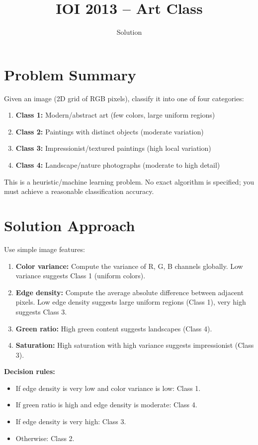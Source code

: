 \documentclass[11pt,a4paper]{article}
\title{IOI 2013 -- Art Class}
\author{Solution}
\date{}
\begin{document}
\maketitle

\section{Problem Summary}
Given an image (2D grid of RGB pixels), classify it into one of four categories:
\begin{enumerate}
    \item \textbf{Class 1:} Modern/abstract art (few colors, large uniform regions)
    \item \textbf{Class 2:} Paintings with distinct objects (moderate variation)
    \item \textbf{Class 3:} Impressionist/textured paintings (high local variation)
    \item \textbf{Class 4:} Landscape/nature photographs (moderate to high detail)
\end{enumerate}

This is a heuristic/machine learning problem. No exact algorithm is specified; you must achieve a reasonable classification accuracy.

\section{Solution Approach}
Use simple image features:

\begin{enumerate}
    \item \textbf{Color variance:} Compute the variance of R, G, B channels globally. Low variance suggests Class 1 (uniform colors).
    \item \textbf{Edge density:} Compute the average absolute difference between adjacent pixels. Low edge density suggests large uniform regions (Class 1), very high suggests Class 3.
    \item \textbf{Green ratio:} High green content suggests landscapes (Class 4).
    \item \textbf{Saturation:} High saturation with high variance suggests impressionist (Class 3).
\end{enumerate}

\textbf{Decision rules:}
\begin{itemize}
    \item If edge density is very low and color variance is low: Class 1.
    \item If green ratio is high and edge density is moderate: Class 4.
    \item If edge density is very high: Class 3.
    \item Otherwise: Class 2.
\end{itemize}
\end{document}

